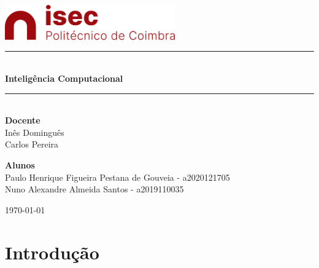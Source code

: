 \documentclass[10pt]{article}
\newcommand{\HRule}{\rule{\linewidth}{0.5mm}}
\begin{document}
\begin{titlepage}
\begin{center}

\includegraphics[width=0.55\textwidth]{img/logo-isec-transparente.png}~\\[2cm]


\HRule \\[0.4cm]
{ \LARGE 
  \textbf{Inteligência Computacional}\\[0.4cm]
}
\HRule \\[1.5cm]

{ \large
  \textbf{Docente} \\[0.1cm]
  Inês Dominguês \\ Carlos Pereira \\[2.5cm]
}


{ \large
  \textbf{Alunos} \\[0.1cm]
  Paulo Henrique Figueira Pestana de Gouveia - a2020121705 \\[0.1cm]
  Nuno Alexandre Almeida Santos - a2019110035\\[0.1cm]
}

\vfill



{\large \today}
 
\end{center}
\end{titlepage}


\newpage



\tableofcontents
{}
\newpage
\setcounter{page}{1}

\large
\section{Introdução}\label{sec:intro}
\end{document}
